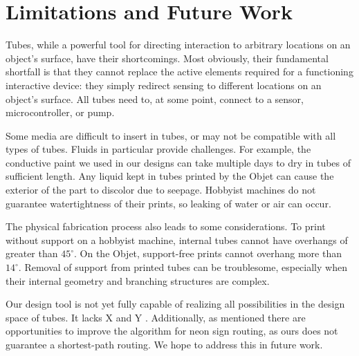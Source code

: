 \section{Limitations and Future Work}
Tubes, while a powerful tool for directing interaction to arbitrary locations on an object's surface, have their shortcomings.  Most obviously, their fundamental shortfall is that they cannot replace the active elements required for a functioning interactive device: they simply redirect sensing to different locations on an object's surface.  All tubes need to, at some point, connect to a sensor, microcontroller, or pump.

Some media are difficult to insert in tubes, or may not be compatible with all types of tubes.  Fluids in particular provide challenges.  For example, the conductive paint we used in our designs can take multiple days to dry in tubes of sufficient length.  Any liquid kept in tubes printed by the Objet can cause the exterior of the part to discolor due to seepage.  Hobbyist machines do not guarantee watertightness of their prints, so leaking of water or air can occur.

The physical fabrication process also leads to some considerations.  To print without support on a hobbyist machine, internal tubes cannot have overhangs of greater than $45^{\circ}$.  On the Objet, support-free prints cannot overhang more than $14^{\circ}$.  Removal of support from printed tubes can be troublesome, especially when their internal geometry and branching structures are complex.

Our design tool is not yet fully capable of realizing all possibilities in the design space of tubes.  It lacks X and Y .  Additionally, as mentioned there are opportunities to improve the algorithm for neon sign routing, as ours does not guarantee a shortest-path routing.  We hope to address this in future work.


